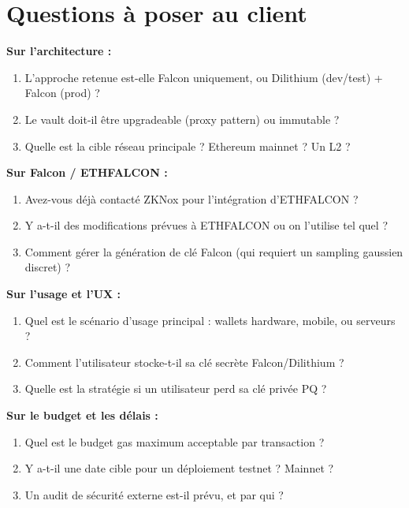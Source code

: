\documentclass[12pt, a4paper]{article}
\begin{document}
\section{Questions à poser au client}

\begin{tcolorbox}[colback=warn_bg, colframe=orange!80!black,
  title=\textbf{Questions techniques prioritaires}, breakable]

\textbf{Sur l'architecture :}
\begin{enumerate}
  \item L'approche retenue est-elle Falcon uniquement, ou Dilithium (dev/test) + Falcon (prod) ?
  \item Le vault doit-il être upgradeable (proxy pattern) ou immutable ?
  \item Quelle est la cible réseau principale ? Ethereum mainnet ? Un L2 ?

\end{enumerate}

\textbf{Sur Falcon / ETHFALCON :}
\begin{enumerate}[resume]
  \item Avez-vous déjà contacté ZKNox pour l'intégration d'ETHFALCON ?
  \item Y a-t-il des modifications prévues à ETHFALCON ou on l'utilise tel quel ?
  \item Comment gérer la génération de clé Falcon (qui requiert un sampling gaussien discret) ?
\end{enumerate}

\textbf{Sur l'usage et l'UX :}
\begin{enumerate}[resume]
  \item Quel est le scénario d'usage principal : wallets hardware, mobile, ou serveurs ?
  \item Comment l'utilisateur stocke-t-il sa clé secrète Falcon/Dilithium ?
  \item Quelle est la stratégie si un utilisateur perd sa clé privée PQ ?
\end{enumerate}

\textbf{Sur le budget et les délais :}
\begin{enumerate}[resume]
  \item Quel est le budget gas maximum acceptable par transaction ?
  \item Y a-t-il une date cible pour un déploiement testnet ? Mainnet ?
  \item Un audit de sécurité externe est-il prévu, et par qui ?
\end{enumerate}
\end{tcolorbox}
\end{document}
